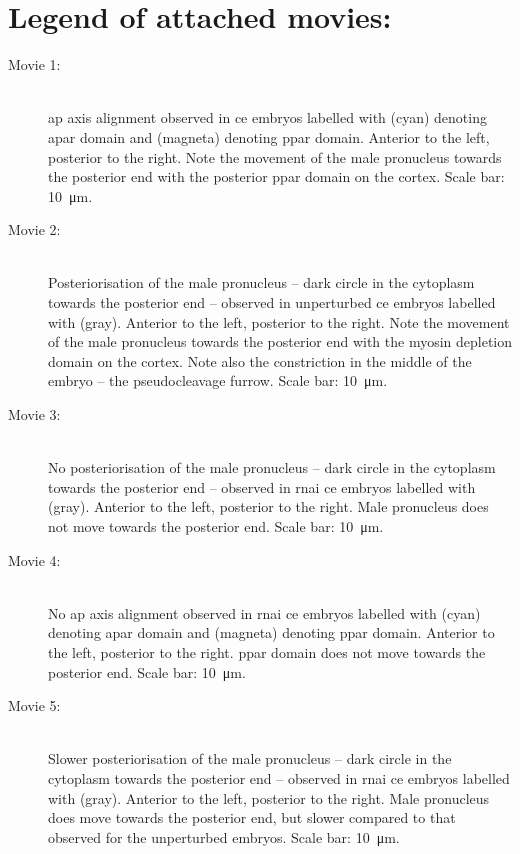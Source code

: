 \section*{Legend of attached movies:}
\begin{description}
\item[Movie 1:]\hfill\\
\ac{ap} axis alignment observed in \ac{ce} embryos labelled with  (cyan) denoting \ac{apar} domain and  (magneta) denoting \ac{ppar} domain. Anterior to the left, posterior to the right. Note the movement of the male pronucleus towards the posterior end with the posterior \ac{ppar} domain on the cortex. Scale bar: \SI{10}{\micro\meter}.
\item[Movie 2:]\hfill\\
Posteriorisation of the male pronucleus -- dark circle in the cytoplasm towards the posterior end -- observed in unperturbed \ac{ce} embryos labelled with  (gray). Anterior to the left, posterior to the right. Note the movement of the male pronucleus towards the posterior end with the myosin depletion domain on the cortex. Note also the constriction in the middle of the embryo -- the pseudocleavage furrow. Scale bar: \SI{10}{\micro\meter}.
\item[Movie 3:]\hfill\\
No posteriorisation of the male pronucleus -- dark circle in the cytoplasm towards the posterior end -- observed in  \ac{rnai} \ac{ce} embryos labelled with  (gray). Anterior to the left, posterior to the right. Male pronucleus does not move towards the posterior end. Scale bar: \SI{10}{\micro\meter}.
\item[Movie 4:]\hfill\\
No \ac{ap} axis alignment observed in  \ac{rnai} \ac{ce} embryos labelled with  (cyan) denoting \ac{apar} domain and  (magneta) denoting \ac{ppar} domain. Anterior to the left, posterior to the right. \ac{ppar} domain does not move towards the posterior end. Scale bar: \SI{10}{\micro\meter}.
\item[Movie 5:]\hfill\\
Slower posteriorisation of the male pronucleus -- dark circle in the cytoplasm towards the posterior end -- observed in  \ac{rnai} \ac{ce} embryos labelled with  (gray). Anterior to the left, posterior to the right. Male pronucleus does move towards the posterior end, but slower compared to that observed for the unperturbed embryos. Scale bar: \SI{10}{\micro\meter}.

\end{description}
